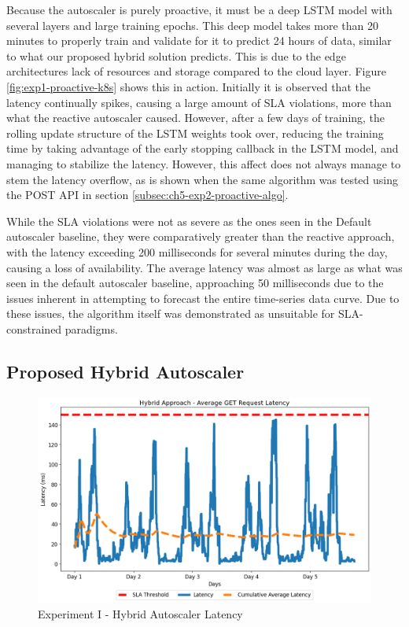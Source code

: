 Because the autoscaler is purely proactive, it must be a deep LSTM model with several layers and large training epochs. This deep model takes more than 20 minutes to properly train and validate for it to predict 24 hours of data, similar to what our proposed hybrid solution predicts. This is due to the edge architectures lack of resources and storage compared to the cloud layer. Figure \ref{fig:exp1-proactive-k8s} shows this in action. Initially it is observed that the latency continually spikes, causing a large amount of SLA violations, more than what the reactive autoscaler caused. However, after a few days of training, the rolling update structure of the LSTM weights took over, reducing the training time by taking advantage of the early stopping callback in the LSTM model, and managing to stabilize the latency. However, this affect does not always manage to stem the latency overflow, as is shown when the same algorithm was tested using the POST API in section \ref{subsec:ch5-exp2-proactive-algo}.

While the SLA violations were not as severe as the ones seen in the Default autoscaler baseline, they were comparatively greater than the reactive approach, with the latency exceeding 200 milliseconds for several minutes during the day, causing a loss of availability. The average latency was almost as large as what was seen in the default autoscaler baseline, approaching 50 milliseconds due to the issues inherent in attempting to forecast the entire time-series data curve.  Due to these issues, the algorithm itself was demonstrated as unsuitable for SLA-constrained paradigms.\par

\subsection {Proposed Hybrid Autoscaler}
\label{subsec:ch5-exp1-hybrid-algo}

\begin{figure}[htb]
    \centering
    \caption{Experiment I - Hybrid Autoscaler Latency}
    \label{fig:exp1-hybrid-k8s}
    \includegraphics[width=0.6\linewidth]{Figures/Home-Timeline-Hybrid-Latency.png}
\end{figure}

